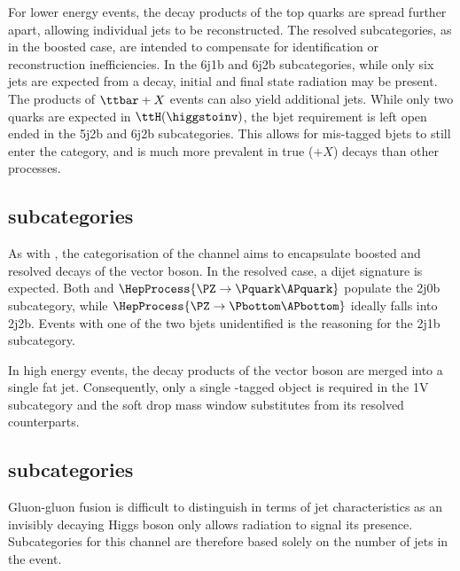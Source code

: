 For lower energy events, the decay products of the top quarks are spread further apart, allowing individual \glspl{jet} to be reconstructed. The \ttH resolved subcategories, as in the boosted case, are intended to compensate for identification or reconstruction inefficiencies. In the 6j1b and 6j2b subcategories, while only six \glspl{jet} are expected from a \ttbar decay, initial and final state radiation may be present. The products of $\ttbar + X$ events can also yield additional jets. While only two \Pbottom quarks are expected in $\ttH(\higgstoinv)$, the \gls{bjet} requirement is left open ended in the 5j2b and 6j2b subcategories. This allows for mis-tagged \glspl{bjet} to still enter the category, and is much more prevalent in true \ttbar ($+ X$) decays than other processes.




\subsection{\texorpdfstring{\VH}{VH} subcategories}
\label{subsec:htoinv_VH_subcats}

As with \ttH, the categorisation of the \VH channel aims to encapsulate boosted and resolved decays of the vector boson. In the resolved case, a dijet signature is expected. Both \PW and $\HepProcess{\PZ \to \Pquark\APquark}$ populate the 2j0b subcategory, while $\HepProcess{\PZ \to \Pbottom\APbottom}$ ideally falls into 2j2b. Events with one of the two \glspl{bjet} unidentified is the reasoning for the 2j1b subcategory.

In high energy events, the decay products of the vector boson are merged into a single fat jet. Consequently, only a single \PVec-tagged object is required in the 1V subcategory and the soft drop mass window substitutes \mjj from its resolved counterparts.




\subsection{\texorpdfstring{\ggH}{ggH} subcategories}
\label{subsec:htoinv_ggH_subcats}

Gluon-gluon fusion is difficult to distinguish in terms of jet characteristics as an invisibly decaying Higgs boson only allows radiation to signal its presence. Subcategories for this channel are therefore based solely on the number of \glspl{jet} in the event.

